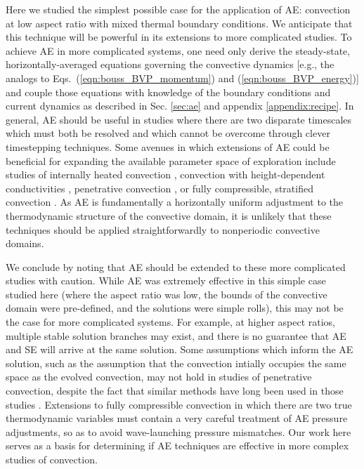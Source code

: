 Here we studied the simplest possible case for the application of AE:
\RB convection at low aspect ratio with mixed thermal boundary conditions. 
We anticipate that
this technique will be powerful in its extensions to more complicated studies.
To achieve AE in more complicated systems, one need only derive 
the steady-state, horizontally-averaged equations governing
the convective dynamics
[e.g., the analogs to Eqs.~(\ref{eqn:bouss_BVP_momentum}) and (\ref{eqn:bouss_BVP_energy})]
and couple those equations with knowledge of the boundary conditions
and current dynamics as described in
Sec. \ref{sec:ae} and appendix \ref{appendix:recipe}.
In general, AE should be useful in studies where there are two disparate
timescales which must both be resolved and which cannot be overcome through
clever timestepping techniques.  Some avenues in which extensions of AE could
be beneficial for expanding the available parameter space of exploration
include studies of internally heated convection \cite{goluskin2016},
convection with height-dependent conductivities \cite{kapyla&all2017},
penetrative convection \cite{hurlburt&all1986,brandenburg&all2005,couston&all2017},
or fully compressible, stratified convection \cite{anders&brown2017}.
As AE is fundamentally a horizontally uniform adjustment to the thermodynamic
structure of the convective domain, it is unlikely that these techniques
should be applied straightforwardly to nonperiodic convective domains.

We conclude by noting that AE should be extended to these more complicated
studies with caution. 
While AE was extremely effective in this simple case studied here
(where the aspect ratio was low, 
the bounds of the convective domain were pre-defined,
and the solutions were simple rolls),
this may not be the case for more complicated systems. For example, at
higher aspect ratios, multiple stable solution branches 
may exist, and there is no guarantee that AE and SE will
arrive at the same solution. 
Some assumptions which inform the AE solution, such as the assumption
that the convection
intially occupies the same space as the evolved convection, may not hold in
studies of penetrative convection, despite the fact that similar methods have
long been used in those studies \cite{hurlburt&all1986}. Extensions to 
fully compressible convection in which there are two true thermodynamic
variables \cite{anders&brown2017} must contain a very careful treatment of
AE pressure adjustments, so as to avoid wave-launching pressure mismatches.
Our work here serves as a basis for determining if AE techniques are
effective in more complex studies of convection.


